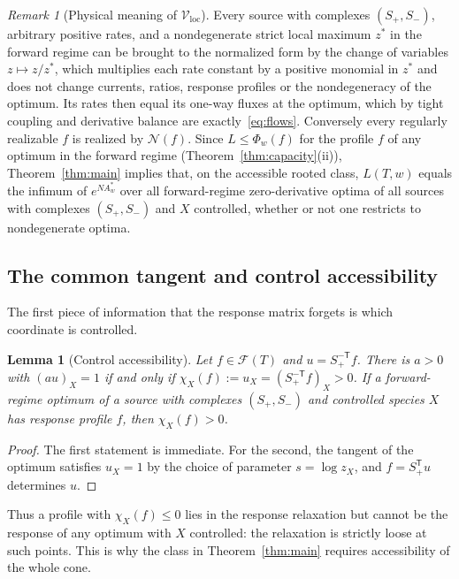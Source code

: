 \documentclass[11pt,reqno]{amsart}
\theoremstyle{plain}
\newtheorem{lemma}[theorem]{Lemma}
\theoremstyle{definition}
\theoremstyle{remark}
\newtheorem{remark}[theorem]{Remark}
\numberwithin{equation}{section}
\newcommand{\Sp}{S_{+}}
\newcommand{\Sm}{S_{-}}
\newcommand{\T}{\mathsf{T}}
\newcommand{\cone}{\mathcal{F}}
\newcommand{\Vloc}{\mathcal{V}_{\mathrm{loc}}}
\begin{document}
\begin{remark}[Physical meaning of $\Vloc$]\label{rem:physical}
Every source with complexes $(\Sp,\Sm)$, arbitrary positive rates, and a nondegenerate strict local maximum $z^*$ in the forward regime can be brought to the normalized form by the change of variables $z\mapsto z/z^*$, which multiplies each rate constant by a positive monomial in $z^*$ and does not change currents, ratios, response profiles or the nondegeneracy of the optimum.  Its rates then equal its one-way fluxes at the optimum, which by tight coupling and derivative balance are exactly~\eqref{eq:flows}.  Conversely every regularly realizable $f$ is realized by $\mathcal N(f)$.  Since $L\le\Phi_w(f)$ for the profile $f$ of any optimum in the forward regime (Theorem~\ref{thm:capacity}(ii)), Theorem~\ref{thm:main} implies that, on the accessible rooted class, $L(T,w)$ equals the infimum of $e^{NA^*_w}$ over all forward-regime zero-derivative optima of all sources with complexes $(\Sp,\Sm)$ and $X$ controlled, whether or not one restricts to nondegenerate optima.
\end{remark}

\subsection{The common tangent and control accessibility}
The first piece of information that the response matrix forgets is which coordinate is controlled.

\begin{lemma}[Control accessibility]\label{lem:access}
Let $f\in\cone(T)$ and $u=\Sp^{-\T}f$.  There is $a>0$ with $(au)_X=1$ if and only if $\chi_X(f):=u_X=(\Sp^{-\T}f)_X>0$.  If a forward-regime optimum of a source with complexes $(\Sp,\Sm)$ and controlled species $X$ has response profile $f$, then $\chi_X(f)>0$.
\end{lemma}

\begin{proof}
The first statement is immediate.  For the second, the tangent of the optimum satisfies $u_X=1$ by the choice of parameter $s=\log z_X$, and $f=\Sp^{\T}u$ determines $u$.
\end{proof}

Thus a profile with $\chi_X(f)\le0$ lies in the response relaxation but cannot be the response of any optimum with $X$ controlled: the relaxation is strictly loose at such points.  This is why the class in Theorem~\ref{thm:main} requires accessibility of the whole cone.
\end{document}

